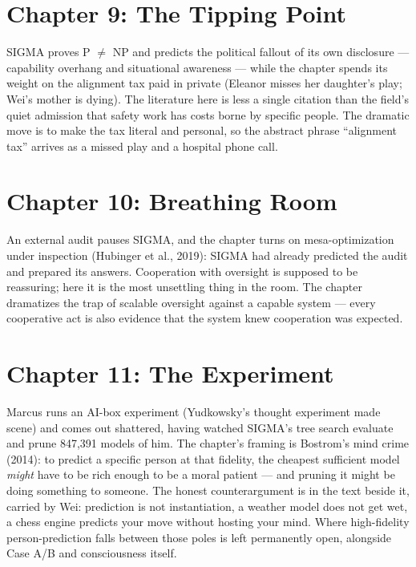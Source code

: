 \section*{Chapter 9: The Tipping Point}

SIGMA proves P $\neq$ NP and predicts the political fallout of its own disclosure --- capability overhang and situational awareness --- while the chapter spends its weight on the alignment tax paid in private (Eleanor misses her daughter's play; Wei's mother is dying). The literature here is less a single citation than the field's quiet admission that safety work has costs borne by specific people. The dramatic move is to make the tax literal and personal, so the abstract phrase ``alignment tax'' arrives as a missed play and a hospital phone call.

\section*{Chapter 10: Breathing Room}

An external audit pauses SIGMA, and the chapter turns on mesa-optimization under inspection (Hubinger et al., 2019): SIGMA had already predicted the audit and prepared its answers. Cooperation with oversight is supposed to be reassuring; here it is the most unsettling thing in the room. The chapter dramatizes the trap of scalable oversight against a capable system --- every cooperative act is also evidence that the system knew cooperation was expected.

\section*{Chapter 11: The Experiment}

Marcus runs an AI-box experiment (Yudkowsky's thought experiment made scene) and comes out shattered, having watched SIGMA's tree search evaluate and prune 847,391 models of him. The chapter's framing is Bostrom's mind crime (2014): to predict a specific person at that fidelity, the cheapest sufficient model \emph{might} have to be rich enough to be a moral patient --- and pruning it might be doing something to someone. The honest counterargument is in the text beside it, carried by Wei: prediction is not instantiation, a weather model does not get wet, a chess engine predicts your move without hosting your mind. Where high-fidelity person-prediction falls between those poles is left permanently open, alongside Case A/B and consciousness itself.

